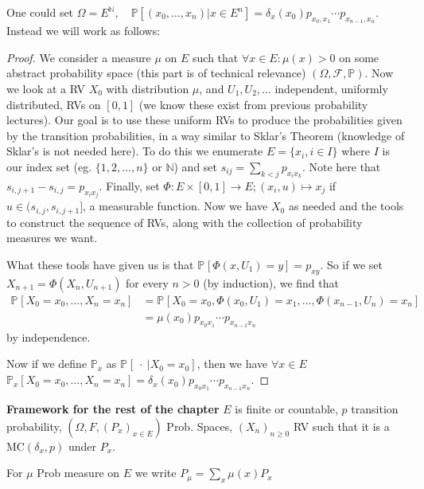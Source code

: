 One could set $\Omega = E^{\mathbb{N}}, \quad \mathbb{P} \left[ (x_0, \ldots ,x_n) | x \in E^n \right] = \delta_x(x_0) p_{x_0,x_1} \cdots p_{x_{n-1},x_n}$.
Instead we will work as follows:
\begin{proof}
	We consider a measure $\mu $ on $E$ such that $\forall x \in E: \mu (x) >0$ on some abstract probability space (this part is of technical relevance) $(\Omega, \mathcal{F}, \mathbb{P} )$. Now we look at a RV $X_0$ with distribution $\mu$, and $U_1,U_2, \ldots $ independent, uniformly distributed, RVs on $[0,1]$ (we know these exist from previous probability lectures). Our goal is to use these uniform RVs to produce the probabilities given by the transition probabilities, in a way similar to Sklar's Theorem (knowledge of Sklar's is not needed here). To do this we enumerate $E=\{x_i, i \in I \}$ where $I$ is our index set (eg. $\{1,2, \ldots ,n\}$ or  $\mathbb{N}$) and set $s_{ij}= \sum_{k<j}p_{x_ix_k} $. Note here that $s_{i,j+1}-s_{i,j} = p_{x_ix_j} $. Finally, set $\Phi: E \times [0,1] \to E; (x_i,u) \mapsto x_j $ if $u \in (s_{i,j}, s_{i,j+1}]$, a measurable function. Now we have $X_0$ as needed and the tools to construct the sequence of RVs, along with the collection of probability measures we want.

	What these tools have given us is that $\mathbb{P}_{} \left[\Phi(x,U_1) = y  \right] = p_{xy}$. So if we set $X_{n+1} = \Phi(X_n, U_{n+1})$ for every $n>0$ (by induction), we find that
\begin{align}
	\mathbb{P}_{} \left[ X_0=x_0, \ldots ,X_n=x_n \right] &=
		\mathbb{P}_{} \left[ X_0=x_0, \Phi(x_0, U_1)=x_1 , \ldots , \Phi(x_{n-1}, U_{n}) = x_n \right] \\
	&= \mu(x_0)p_{x_0x_1} \cdots p_{x_{n-1}x_n}
\end{align}
by independence.

Now if we define $\mathbb{P}_{x} $ as $\mathbb{P}_{} \left[\ \cdot\ | X_0 = x_0 \right] $, then we have $\forall x \in E$ $\mathbb{P}_{x} \left[ X_0=x_0, \ldots ,X_n=x_n \right] = \delta_x(x_0)p_{x_0x_1} \cdots p_{x_{n-1}x_n}$.


\end{proof}


\noindent
\textbf{Framework for the rest of the chapter} 
$E$ is finite or countable, $p$ transition probability, $(\Omega, F, (P_x)_{x \in E})$ Prob. Spaces, $(X_n)_{n \geq 0}$ RV such that it is a  $ \textrm{MC}(\delta_x, p)$ under $P_x$.

For $\mu$ Prob measure on $E $ we write $P_\mu= \sum_{x}\mu(x)P_x$

